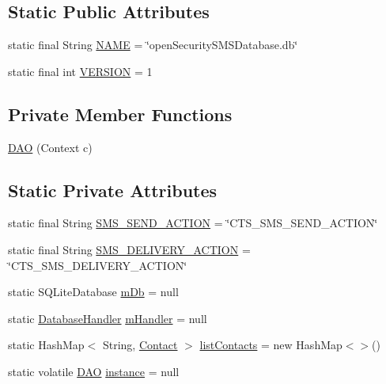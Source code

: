 \subsection*{Static Public Attributes}
\begin{DoxyCompactItemize}
\item 
static final String \hyperlink{a00009_a2e2a8b5e4b33363e36e2d75ff425c86c}{N\+A\+M\+E} = \char`\"{}open\+Security\+S\+M\+S\+Database.\+db\char`\"{}
\item 
static final int \hyperlink{a00009_a6cad282e2a906561926b9e4c5c46e92a}{V\+E\+R\+S\+I\+O\+N} = 1
\end{DoxyCompactItemize}
\subsection*{Private Member Functions}
\begin{DoxyCompactItemize}
\item 
\hyperlink{a00009_af8530c35cbb3602bcea42535ab31e9a6}{D\+A\+O} (Context c)
\end{DoxyCompactItemize}
\subsection*{Static Private Attributes}
\begin{DoxyCompactItemize}
\item 
static final String \hyperlink{a00009_ae783da46195d548123aa679a2040c53d}{S\+M\+S\+\_\+\+S\+E\+N\+D\+\_\+\+A\+C\+T\+I\+O\+N} = \char`\"{}C\+T\+S\+\_\+\+S\+M\+S\+\_\+\+S\+E\+N\+D\+\_\+\+A\+C\+T\+I\+O\+N\char`\"{}
\item 
static final String \hyperlink{a00009_a134bdf0d10a1ebe6bc019d986853ca23}{S\+M\+S\+\_\+\+D\+E\+L\+I\+V\+E\+R\+Y\+\_\+\+A\+C\+T\+I\+O\+N} = \char`\"{}C\+T\+S\+\_\+\+S\+M\+S\+\_\+\+D\+E\+L\+I\+V\+E\+R\+Y\+\_\+\+A\+C\+T\+I\+O\+N\char`\"{}
\item 
static S\+Q\+Lite\+Database \hyperlink{a00009_a1b26570b52d9895c151f669c750358a8}{m\+Db} = null
\item 
static \hyperlink{a00010}{Database\+Handler} \hyperlink{a00009_ac19fc67c8ce8c11d34068a8963eb01dc}{m\+Handler} = null
\item 
static Hash\+Map$<$ String, \hyperlink{a00005}{Contact} $>$ \hyperlink{a00009_a42b678132ea8e78c62ce961e43078bca}{list\+Contacts} = new Hash\+Map$<$$>$()
\item 
static volatile \hyperlink{a00009}{D\+A\+O} \hyperlink{a00009_a01e7d5986bec56c6371309b48469a8cd}{instance} = null
\end{DoxyCompactItemize}


